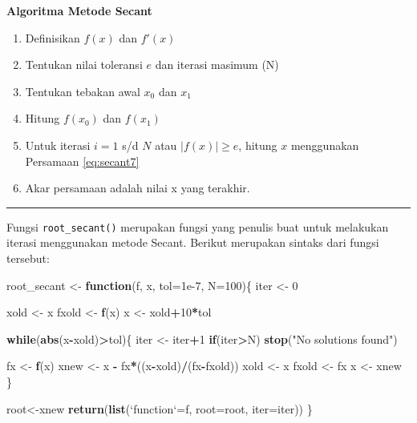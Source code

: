 \documentclass[]{book}
\newenvironment{Shaded}{\begin{snugshade}}{\end{snugshade}}
\newcommand{\ControlFlowTok}[1]{\textcolor[rgb]{0.13,0.29,0.53}{\textbf{#1}}}
\newcommand{\DataTypeTok}[1]{\textcolor[rgb]{0.13,0.29,0.53}{#1}}
\newcommand{\DecValTok}[1]{\textcolor[rgb]{0.00,0.00,0.81}{#1}}
\newcommand{\FloatTok}[1]{\textcolor[rgb]{0.00,0.00,0.81}{#1}}
\newcommand{\KeywordTok}[1]{\textcolor[rgb]{0.13,0.29,0.53}{\textbf{#1}}}
\newcommand{\NormalTok}[1]{#1}
\newcommand{\OperatorTok}[1]{\textcolor[rgb]{0.81,0.36,0.00}{\textbf{#1}}}
\newcommand{\StringTok}[1]{\textcolor[rgb]{0.31,0.60,0.02}{#1}}
\providecommand{\tightlist}{%
  \setlength{\itemsep}{0pt}\setlength{\parskip}{0pt}}
\theoremstyle{definition}
\theoremstyle{definition}
\theoremstyle{definition}
\theoremstyle{remark}
\begin{document}
\textbf{Algoritma Metode Secant}

\begin{enumerate}
\def\labelenumi{\arabic{enumi}.}
\tightlist
\item
  Definisikan \(f\left(x \right)\) dan \(f'\left(x \right)\)
\item
  Tentukan nilai toleransi \(e\) dan iterasi masimum (N)
\item
  Tentukan tebakan awal \(x_0\) dan \(x_1\)
\item
  Hitung \(f\left(x_0 \right)\) dan \(f\left(x_1 \right)\)
\item
  Untuk iterasi \(i=1\) s/d \(N\) atau \(\left|f\left(x \right) \right|\ge e\), hitung \(x\) menggunakan Persamaan \eqref{eq:secant7}
\item
  Akar persamaan adalah nilai x yang terakhir.
\end{enumerate}

\begin{center}\rule{0.5\linewidth}{\linethickness}\end{center}

Fungsi \texttt{root\_secant()} merupakan fungsi yang penulis buat untuk melakukan iterasi menggunakan metode Secant. Berikut merupakan sintaks dari fungsi tersebut:

\begin{Shaded}
\begin{Highlighting}[]
\NormalTok{root_secant <-}\StringTok{ }\ControlFlowTok{function}\NormalTok{(f, x, }\DataTypeTok{tol=}\FloatTok{1e-7}\NormalTok{, }\DataTypeTok{N=}\DecValTok{100}\NormalTok{)\{}
\NormalTok{  iter <-}\StringTok{ }\DecValTok{0}
  
\NormalTok{  xold <-}\StringTok{ }\NormalTok{x}
\NormalTok{  fxold <-}\StringTok{ }\KeywordTok{f}\NormalTok{(x)}
\NormalTok{  x <-}\StringTok{ }\NormalTok{xold}\OperatorTok{+}\DecValTok{10}\OperatorTok{*}\NormalTok{tol}
  
  \ControlFlowTok{while}\NormalTok{(}\KeywordTok{abs}\NormalTok{(x}\OperatorTok{-}\NormalTok{xold)}\OperatorTok{>}\NormalTok{tol)\{}
\NormalTok{    iter <-}\StringTok{ }\NormalTok{iter}\OperatorTok{+}\DecValTok{1}
    \ControlFlowTok{if}\NormalTok{(iter}\OperatorTok{>}\NormalTok{N)}
      \KeywordTok{stop}\NormalTok{(}\StringTok{"No solutions found"}\NormalTok{)}
    
\NormalTok{    fx <-}\StringTok{ }\KeywordTok{f}\NormalTok{(x)}
\NormalTok{    xnew <-}\StringTok{ }\NormalTok{x }\OperatorTok{-}\StringTok{ }\NormalTok{fx}\OperatorTok{*}\NormalTok{((x}\OperatorTok{-}\NormalTok{xold)}\OperatorTok{/}\NormalTok{(fx}\OperatorTok{-}\NormalTok{fxold))}
\NormalTok{    xold <-}\StringTok{ }\NormalTok{x}
\NormalTok{    fxold <-}\StringTok{ }\NormalTok{fx}
\NormalTok{    x <-}\StringTok{ }\NormalTok{xnew}
\NormalTok{  \}}
  
\NormalTok{  root<-xnew}
  \KeywordTok{return}\NormalTok{(}\KeywordTok{list}\NormalTok{(}\StringTok{`}\DataTypeTok{function}\StringTok{`}\NormalTok{=f, }\DataTypeTok{root=}\NormalTok{root, }\DataTypeTok{iter=}\NormalTok{iter))}
\NormalTok{\}}
\end{Highlighting}
\end{Shaded}
\end{document}
